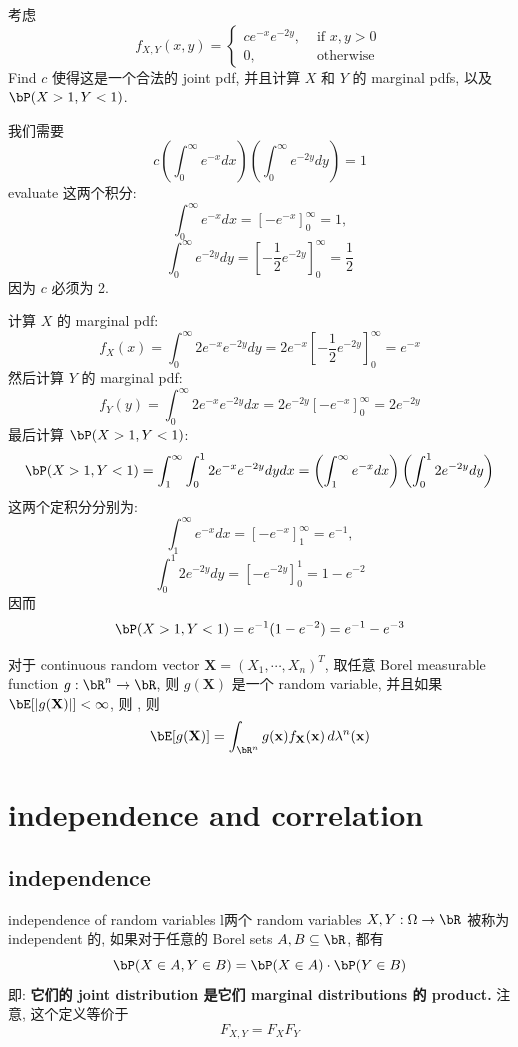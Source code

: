 \begin{example}
考虑 
\[
f_{X, Y}(x, y)= \begin{cases}c e^{-x} e^{-2 y}, & \text { if } x, y>0 \\ 0, & \text { otherwise }\end{cases}
\]
Find \(c\) 使得这是一个合法的 joint pdf, 
并且计算 \(X\) 和 \(Y\) 的 marginal pdfs, 以及 \(\bP(X>1, Y<1)\).
\begin{solution}
我们需要
$$c \left( \int_{0}^{\infty} e^{-x} dx \right) \left( \int_{0}^{\infty} e^{-2 y} dy \right) = 1$$
evaluate 这两个积分:
$$\int_{0}^{\infty} e^{-x} dx = \left[ -e^{-x} \right]_{0}^{\infty} = 1,$$
$$\int_{0}^{\infty} e^{-2 y} dy = \left[ -\frac{1}{2} e^{-2 y} \right]_{0}^{\infty} = \frac{1}{2}$$
因为 \(c\) 必须为 2.

计算 \(X\) 的 marginal pdf:
$$f_X(x) = \int_{0}^{\infty} 2 e^{-x} e^{-2 y} dy = 2 e^{-x} \left[ -\frac{1}{2} e^{-2 y} \right]_{0}^{\infty} = e^{-x}$$
然后计算 \(Y\) 的 marginal pdf:
$$f_Y(y) = \int_{0}^{\infty} 2 e^{-x} e^{-2 y} dx = 2 e^{-2 y} \left[ -e^{-x} \right]_{0}^{\infty} = 2 e^{-2 y}$$
最后计算 \(\bP(X>1, Y<1)\):
$$\bP(X > 1, Y < 1) = \int_{1}^{\infty} \int_{0}^{1} 2 e^{-x} e^{-2 y} dy dx = \left( \int_{1}^{\infty} e^{-x} dx \right) \left( \int_{0}^{1} 2 e^{-2 y} dy \right)$$
这两个定积分分别为:
$$\int_{1}^{\infty} e^{-x} dx = \left[ -e^{-x} \right]_{1}^{\infty} = e^{-1},$$
$$\int_{0}^{1} 2 e^{-2 y} dy = \left[ -e^{-2 y} \right]_{0}^{1} = 1 - e^{-2}$$ 
因而$$\bP(X > 1, Y < 1) = e^{-1} (1 - e^{-2}) = e^{-1} - e^{-3}$$
\end{solution}
\end{example}

\begin{theorem}
    对于 continuous random vector \(\mathbf{X} = (X_1, \cdots, X_n)^T\),
取任意 Borel measurable function \(g: \bR^n \to \bR\),
则 \(g(\mathbf{X})\) 是一个 random variable, 并且如果 \(\bE[|g(\mathbf{X})|] < \infty\), 则
, 则
$$\bE[g(\mathbf{X})] = \int_{\bR^n} g(\mathbf{x}) f_{\mathbf{X}}(\mathbf{x}) \, d\lambda^n(\mathbf{x})$$
\end{theorem}


\section{independence and correlation}
\subsection{independence}
\begin{definition}{independence of random variables}
    l两个 random variables \(X, Y: \Omega \to \bR\) 被称为 independent 的, 
    如果对于任意的 Borel sets \(A, B \subseteq \bR\), 都有
    \[
    \bP(X \in A, Y \in B) = \bP(X \in A) \cdot \bP(Y \in B)
    \]
    即: \textbf{它们的 joint distribution 是它们 marginal distributions 的 product.}
    注意, 这个定义等价于 \[
    F_{X,Y} = F_X F_Y
    \]
\end{definition}

